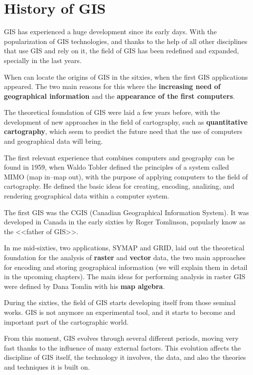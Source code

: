 
\chapter{History of GIS}


\pagestyle{fancy}

GIS has experienced a huge development since its early days. With the popularization of GIS technologies, and thanks to the help of all other disciplines that use GIS and rely on it, the field of GIS has been redefined and expanded, specially in the last years.

When can locate the origins of GIS in the sitxies, when the first GIS applications appeared. The two main reasons for this where the \textbf{increasing need of geographical information} and the \textbf{appearance of the first computers}.

The theoretical foundation of GIS were laid a few years before, with the development of new approaches in the field of cartography, such as \textbf{quantitative cartography}, which seem to predict the future need that the use of computers and geographical data will bring.

The first relevant experience that combines computers and geography can be found in 1959, when Waldo Tobler defined the principles of a system called MIMO (map in--map out), with the purpose of applying computers to the field of cartography. He defined the basic ideas for creating, encoding, analizing, and rendering geographical data within a computer system.

The first GIS was the CGIS (Canadian Geographical Information System). It was developed in Canada in the early sixties by Roger Tomlinson, popularly know as the <<father of GIS>>.

In me mid-sixties, two applications, SYMAP and GRID, laid out the theoretical foundation for the analysis of \textbf{raster} and \textbf{vector} data, the two main approaches for encoding and storing geographical information (we will explain them in detail in the upcoming chapters). The main ideas for performing analysis in raster GIS were defined by Dana Tomlin with his \textbf{map algebra}.

During the sixties, the field of GIS starts developing itself from those seminal works. GIS is not anymore an experimental tool, and it starts to become and important part of the cartographic world.

From this moment, GIS evolves through several different periods, moving very fast thanks to the influence of many external factors. This evolution affects the discipline of GIS itself, the technology it involves, the data, and also the theories and techniques it is built on.



